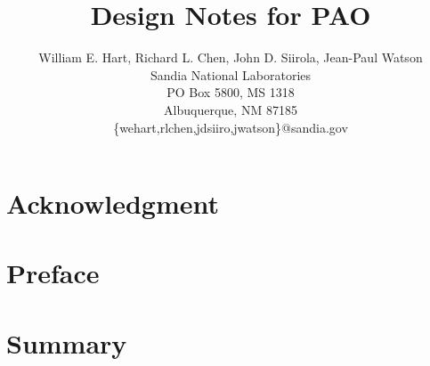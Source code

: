\documentclass[relax,pdf,12pt,article]{SANDreport}
\title{Design Notes for PAO}
\author{William E. Hart, Richard L. Chen, John D. Siirola, Jean-Paul Watson\\
           Sandia National Laboratories\\
           PO Box 5800, MS 1318 \\
           Albuquerque, NM 87185 \\
           \{wehart,rlchen,jdsiiro,jwatson\}@sandia.gov
           }
\date{}
\begin{document}

    \maketitle

    \begin{abstract}
	
    \end{abstract}


    \clearpage
    \section*{Acknowledgment}
	


    \cleardoublepage		%
    \tableofcontents


    \clearpage
    \section*{Preface}
	
    \fi


    \clearpage
    \section*{Summary}
	
    \fi
\end{document}
